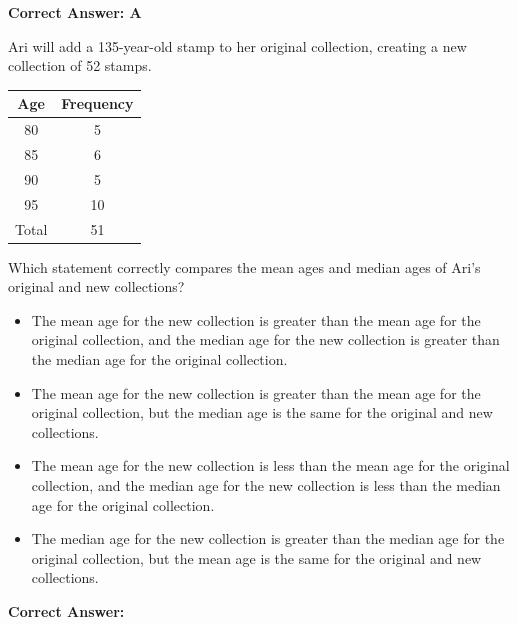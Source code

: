 \documentclass{article}
\begin{document}
\begin{tcolorbox}[colback=green!10, colframe=green!50!black,title=Answer to Question 15]
\textbf{Correct Answer: A}  
\end{tcolorbox}

\vspace{20pt}

\begin{tcolorbox}[colback=blue!5!white,colframe=blue!75!black,title=Question 16]
Ari will add a 135-year-old stamp to her original collection, creating a new collection of 52 stamps.

\begin{center}
\begin{tabular}{|c|c|}
\hline
Age & Frequency \\
\hline
80  & 5  \\
85  & 6  \\
90  & 5  \\
95  & 10  \\
\hline
Total & 51 \\
\hline
\end{tabular}
\end{center}

Which statement correctly compares the mean ages and median ages of Ari’s original and new collections?

\begin{itemize}
    \item[A.] The mean age for the new collection is greater than the mean age for the original collection, and the median age for the new collection is greater than the median age for the original collection.
    \item[B.] The mean age for the new collection is greater than the mean age for the original collection, but the median age is the same for the original and new collections.
    \item[C.] The mean age for the new collection is less than the mean age for the original collection, and the median age for the new collection is less than the median age for the original collection.
    \item[D.] The median age for the new collection is greater than the median age for the original collection, but the mean age is the same for the original and new collections.
\end{itemize}
\end{tcolorbox}

\begin{tcolorbox}[colback=green!10, colframe=green!50!black,title=Answer to Question 16]
\textbf{Correct Answer: 
}  
\end{tcolorbox}
\end{document}
